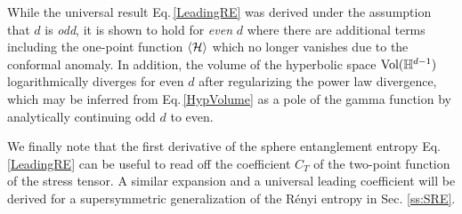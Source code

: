 While the universal result Eq.\,\eqref{LeadingRE} was derived under the assumption that $d$ is \emph{odd}, it is shown to hold for \emph{even} $d$ \cite{Perlmutter:2013gua} where there are additional terms including the one-point function $\langle{\cal H}\rangle$ which no longer vanishes due to the conformal anomaly.
In addition, the volume of the hyperbolic space $\text{Vol}(\mathbb{H}^{d-1})$ logarithmically diverges for even $d$ after regularizing the power law divergence, which may be inferred from Eq.\,\eqref{HypVolume} as a pole of the gamma function by analytically continuing odd $d$ to even.

We finally note that the first derivative of the sphere entanglement entropy Eq.\,\eqref{LeadingRE} can be useful to read off the coefficient $C_T$ of the two-point function of the stress tensor.
A similar expansion and a universal leading coefficient will be derived for a supersymmetric generalization of the R{\'e}nyi entropy in Sec. \ref{ss:SRE}.

\endinput